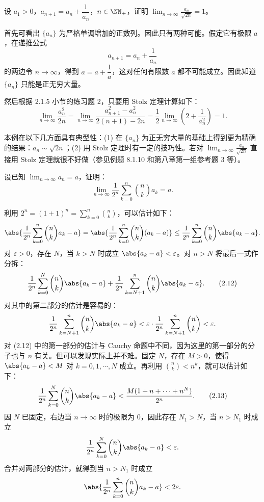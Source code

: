 \begin{xexample}[2.4.2]
设 $a_1>0$，$a_{n+1}=a_n+\dfrac1{a_n}$，$n\in\NN_+$，证明 $\displaystyle\lim_{n\to\infty}\frac{a_n}{\sqrt{2n}}=1$。
\end{xexample}
\begin{xproof}
首先可看出 $\{a_n\}$ 为严格单调增加的正数列。因此只有两种可能。假定它有极限 $a$，在递推公式
\[
  a_{n+1}=a_n+\frac1{a_n}
\]
的两边令 $n\to\infty$，得到 $a=a+\dfrac1a$，这对任何有限数 $a$ 都不可能成立。因此知道 $\{a_n\}$ 只能是正无穷大量。

然后根据 2.1.5 小节的练习题 2，只要用 Stolz 定理计算如下：
\[
  \lim_{n\to\infty}\frac{a_n^2}{2n}
  =\lim_{n\to\infty}\frac{a_{n+1}^2-a_n^2}{2(n+1)-2n}
  =\frac12\lim_{n\to\infty}\left(2+\frac1{a_n^2}\right)=1.
\]
\end{xproof}

\begin{xremark}
本例在以下几方面具有典型性：(1) 在 $\{a_n\}$ 为正无穷大量的基础上得到更为精确的结果：$a_n\sim\sqrt{2n}$；(2) 用 Stolz 定理时有一定的技巧性。若对 $\displaystyle\lim_{n\to\infty}\frac{a_n}{\sqrt{2n}}$ 直接用 Stolz 定理就很不好做（参见例题 8.1.10 和第八章第一组参考题 3 等）。
\end{xremark}

\begin{xexample}[2.4.3]
设已知 $\displaystyle\lim_{n\to\infty}a_n=a$，证明：
\[
  \lim_{n\to\infty}\frac1{2^n}\sum_{k=0}^n\binom nk a_k=a.
\]
\end{xexample}
\begin{xproof}
利用 $2^n=(1+1)^n=\displaystyle\sum_{k=0}^n\binom nk$，可以估计如下：
\[
  \abs{\frac1{2^n}\sum_{k=0}^n\binom nk a_k-a}
  =\abs{\frac1{2^n}\sum_{k=0}^n\binom nk(a_k-a)}
  \le\frac1{2^n}\sum_{k=0}^n\binom nk\abs{a_k-a}.
\]
对 $\varepsilon>0$，存在 $N$，当 $k>N$ 时成立 $\abs{a_k-a}<\varepsilon$。对 $n>N$ 将最后一式作分拆：
\begin{equation}
  \frac1{2^n}\sum_{k=0}^N\binom nk\abs{a_k-a}
  +\frac1{2^n}\sum_{k=N+1}^n\binom nk\abs{a_k-a}.
  \tag{2.12}
  \label{eq:2.12}
\end{equation}
对其中的第二部分的估计是容易的：
\[
  \frac1{2^n}\sum_{k=N+1}^n\binom nk\abs{a_k-a}
  <\varepsilon\cdot\frac1{2^n}\sum_{k=N+1}^n\binom nk<\varepsilon.
\]
对 (2.12) 中的第一部分的估计与 Cauchy 命题中不同，因为这里的第一部分的分子也与 $n$ 有关。但可以发现实际上并不难。固定 $N$，存在 $M>0$，使得 $\abs{a_k-a}<M$ 对 $k=0,1,\cdots,N$ 成立。再利用 $\binom nk<n^k$，就可以估计如下：
\begin{equation}
  \frac1{2^n}\sum_{k=0}^N\binom nk\abs{a_k-a}
  <\frac{M(1+n+\cdots+n^N)}{2^n}.
  \tag{2.13}
  \label{eq:2.13}
\end{equation}
因 $N$ 已固定，右边当 $n\to\infty$ 时的极限为 0，因此存在 $N_1>N$，当 $n>N_1$ 时成立
\[
  \frac1{2^n}\sum_{k=0}^N\binom nk\abs{a_k-a}<\varepsilon.
\]
合并对两部分的估计，就得到当 $n>N_1$ 时成立
\[
  \abs{\frac1{2^n}\sum_{k=0}^n\binom nk a_k-a}<2\varepsilon.
\]
\end{xproof}


